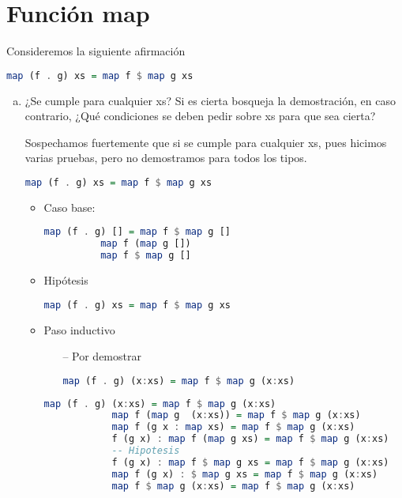 \documentclass[spanish,12pt,letterpaper]{article}
\begin{document}
  \section{Función map}
  Consideremos la siguiente afirmación
  \begin{lstlisting}[language=Haskell]
    map (f . g) xs = map f $ map g xs
  \end{lstlisting}
  \begin{enumerate}[(a)]
  \item ¿Se cumple para cualquier xs? Si es cierta bosqueja la demostración, en
    caso contrario, ¿Qué condiciones se deben pedir sobre xs para que sea cierta?

    Sospechamos fuertemente que si se cumple para cualquier xs, pues hicimos
    varias pruebas, pero no demostramos para todos los tipos.

    \begin{lstlisting}[language=Haskell]
      map (f . g) xs = map f $ map g xs
    \end{lstlisting}
      \begin{itemize}
      \item Caso base:
        \begin{lstlisting}[language=Haskell]
          map (f . g) [] = map f $ map g []
          map f (map g [])
          map f $ map g []
        \end{lstlisting}
      \item Hipótesis
        \begin{lstlisting}[language=Haskell]
          map (f . g) xs = map f $ map g xs
        \end{lstlisting}
        \item Paso inductivo
          \begin{itemize}
          \item [--] Por demostrar
            \begin{lstlisting}[language=Haskell]
              map (f . g) (x:xs) = map f $ map g (x:xs)
            \end{lstlisting}
          \end{itemize}
          \begin{lstlisting}[language=Haskell]
            map (f . g) (x:xs) = map f $ map g (x:xs)
            map f (map g  (x:xs)) = map f $ map g (x:xs)
            map f (g x : map xs) = map f $ map g (x:xs)
            f (g x) : map f (map g xs) = map f $ map g (x:xs)
            -- Hipotesis
            f (g x) : map f $ map g xs = map f $ map g (x:xs)
            map f (g x) : $ map g xs = map f $ map g (x:xs)
            map f $ map g (x:xs) = map f $ map g (x:xs)
          \end{lstlisting}
      \end{itemize}    
    

\end{enumerate}
\end{document}

